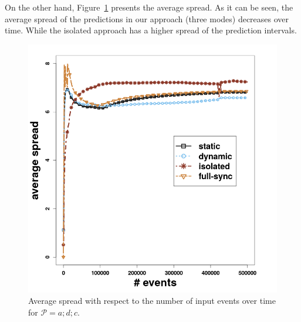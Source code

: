 \par On the other hand, Figure~\ref{fig:spread_synthetic} presents the average spread. As it can be seen, the average spread of the predictions in our approach (three modes) decreases over time. While the isolated approach has a higher spread of the prediction intervals. 

\begin{figure}[H]
	\centering
	\includegraphics[width=\textwidth]{chapters/figures/synthetic/spread_synthetic_15_0001.png}
	
	\caption{Average spread  with respect to the number of input events over time for $\mathcal{P}=a;d;c$.}
	\label{fig:spread_synthetic}
\end{figure}

